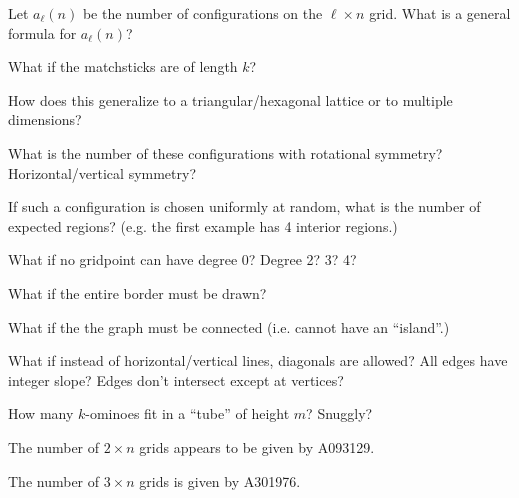 \documentclass{article}
\begin{document}
\begin{question}
  Let $a_\ell(n)$ be the number of configurations on the $\ell \times n$ grid.
  What is a general formula for $a_\ell(n)$?
\end{question}

\begin{related}
  \item What if the matchsticks are of length $k$?
  \item How does this generalize to a triangular/hexagonal lattice or to
    multiple dimensions?
  \item What is the number of these configurations with rotational symmetry?
    Horizontal/vertical symmetry?
  \item If such a configuration is chosen uniformly at random, what is the
    number of expected regions? (e.g. the first example has 4 interior
    regions.)
  \item What if no gridpoint can have degree 0? Degree 2? 3? 4?
  \item What if the entire border must be drawn?
  \item What if the the graph must be connected (i.e. cannot have an ``island''.)
  \item What if instead of horizontal/vertical lines, diagonals are allowed?
    All edges have integer slope?
    Edges don't intersect except at vertices?
  \item How many $k$-ominoes fit in a ``tube'' of height $m$? Snuggly?
\end{related}
\begin{references}
  \item The number of $2 \times n$ grids appears to be given by A093129.
  \item The number of $3 \times n$ grids is given by A301976.
\end{references}
\end{document}
